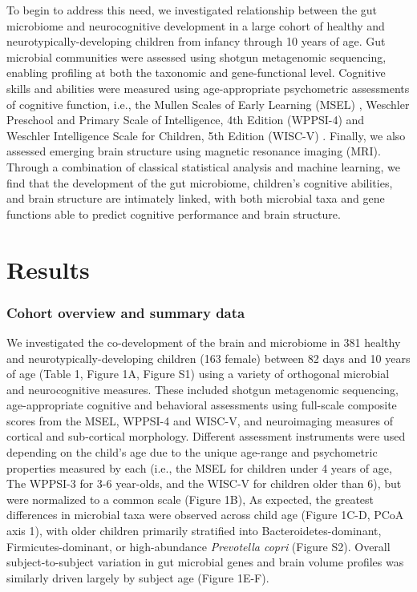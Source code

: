 \documentclass{article}
\begin{document}
To begin to address this need, we investigated relationship between
the gut microbiome and
neurocognitive development in a large cohort of healthy and neurotypically-developing
children from infancy through 10 years of age. Gut microbial
communities were assessed using shotgun metagenomic sequencing, enabling
profiling at both the taxonomic and gene-functional level.
Cognitive skills and abilities were measured using age-appropriate
psychometric assessments of cognitive function, i.e.,
the Mullen Scales of Early Learning (MSEL) \cite{mullenMullenScalesEarly1995},
Weschler Preschool and Primary Scale of Intelligence, 4th Edition (WPPSI-4) 
\cite{wechslerWechslerPreschoolPrimary2012}
and Weschler Intelligence Scale for Children, 5th Edition (WISC-V)
\cite{wechslerWechslerIntelligenceScale1949}.
Finally, we also assessed emerging brain structure using magnetic resonance imaging
(MRI). Through a combination of classical statistical analysis and machine
learning, we find that the development of the gut microbiome,
children's cognitive abilities, and brain structure are intimately linked, with
both microbial taxa and gene functions able to predict cognitive
performance and brain structure.

\section*{Results}

\subsubsection*{Cohort overview and summary data}

We investigated the co-development of the brain and microbiome in
381 healthy and neurotypically-developing children (163 female) between 82 days and 10 years of age
(Table 1,  Figure 1A, Figure S1)
using a variety of orthogonal microbial and neurocognitive measures.
These included shotgun metagenomic sequencing,
age-appropriate cognitive and behavioral assessments
using full-scale composite scores from the MSEL, WPPSI-4 and WISC-V,
and neuroimaging measures of cortical and sub-cortical morphology. 
Different assessment instruments were used depending on the child's age
due to the unique age-range and psychometric properties measured by each
(i.e., the MSEL for children under 4 years of age, The WPPSI-3 for 3-6 year-olds,
and the WISC-V for children older than 6), but were normalized to a common scale (Figure 1B),
As expected, the greatest differences in microbial taxa were observed across
child age (Figure 1C-D, PCoA axis 1), with older children primarily
stratified into Bacteroidetes-dominant, Firmicutes-dominant, or
high-abundance \emph{Prevotella copri} (Figure S2).
Overall subject-to-subject variation in gut microbial genes
and brain volume profiles was similarly driven largely by subject age (Figure 1E-F).
\end{document}
